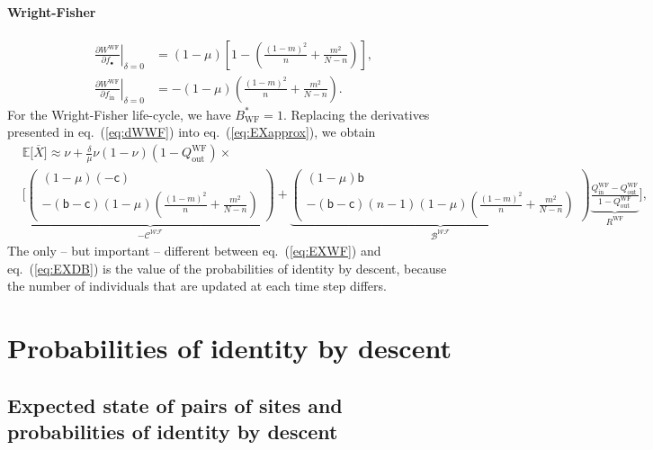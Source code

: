\documentclass[11pt, letterpaper]{article}
\renewcommand{\eqref}[1]{\textup{{\normalfont eq.~(\ref{#1}}\normalfont)}}
\newcommand{\deriv}[2]{\partial_{#2}\!{#1}\,}
\newcommand{\derivv}[3]{\left.\frac{\partial #1}{\partial #2}\right |_{#3=0}} %
\newcommand{\Esp}[1]{\mathbb{E}\big[ #1\big]}%
\newcommand{\bb}{\mathsf{b}}
\newcommand{\cc}{\mathsf{c}}
\newcommand{\WF}{\textrm{WF}}
\newcommand{\mutbias}{\nu}
\newcommand{\inn}{\textrm{in}}
\newcommand{\out}{\textrm{out}}
\newcommand{\focal}{\bullet}
\newcommand{\selstr}{\delta}
\begin{document}
\paragraph{Wright-Fisher}
\begin{subequations}\label{eq:dWWF}
\begin{align}
\derivv{W^{\WF}}{f_{\focal}}{\selstr} &= (1-\mu) \left[ 1 - \left( \frac{(1-m)^2}{n} + \frac{m^2}{N-n}  \right) \right],\\
\derivv{W^{\WF}}{f_{\inn}}{\selstr} &= - (1-\mu) \left( \frac{(1-m)^2}{n} + \frac{m^2}{N-n}  \right). 
\end{align}
\end{subequations}
For the Wright-Fisher life-cycle, we have $B^*_{\WF} = 1$.
%
Replacing the derivatives presented in \eqref{eq:dWWF} into \eqref{eq:EXapprox}, we obtain
%
\begin{equation}\label{eq:EXWF}
\begin{split}
& \Esp{\overline{X}}  \approx \mutbias + 
\frac{\selstr}{\mu}  \mutbias (1-\mutbias) (1 - Q_{\out}^{\WF}) \times \\
 &\Bigg[ \underbrace{ \begin{pmatrix}
 (1-\mu) (-\cc) \\
- (\bb - \cc) (1-\mu) \left( \frac{(1-m)^2}{n} + \frac{m^2}{N-n}\right) 
 \end{pmatrix}
}_{-\mathcal{C^{\WF}}} + \underbrace{ \begin{pmatrix}
(1-\mu) \bb \\
- (\bb - \cc) (n-1)(1-\mu) \left( \frac{(1-m)^2}{n} + \frac{m^2}{N-n} \right) 
\end{pmatrix}
}_{\mathcal{B^{\WF}}} \underbrace{\frac{Q_{\inn}^{\WF} - Q_{\out}^{\WF}}{1 - Q_{\out}^{\WF}}}_{R^{\WF}} \Bigg],
\end{split}
\end{equation}
%
The only -- but important -- different between \eqref{eq:EXWF} and \eqref{eq:EXDB} is the value of the probabilities of identity by descent, because the number of individuals that are updated at each time step differs. 

\clearpage

\section{Probabilities of identity by descent}
\subsection{Expected state of pairs of sites and probabilities of identity by descent\label{sec:app:IBD}}
\end{document}
